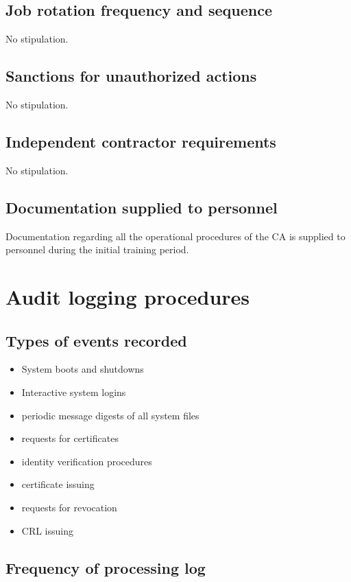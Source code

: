 \documentclass[11pt,a4paper,titlepage]{book}
\begin{document}
\subsection{Job rotation frequency and sequence}

No stipulation.

\subsection{Sanctions for unauthorized actions}

No stipulation.

\subsection{Independent contractor requirements}

No stipulation.

\subsection{Documentation supplied to personnel}

Documentation regarding all the operational procedures of the CA is supplied to personnel during the initial training period.

\section{Audit logging procedures}
\subsection{Types of events recorded}

\begin{itemize}
\item{System boots and shutdowns}
\item{Interactive system logins}
\item{periodic message digests of all system files}
\item{requests for certificates}
\item{identity verification procedures}
\item{certificate issuing}
\item{requests for revocation}
\item{CRL issuing}
\end{itemize}

\subsection{Frequency of processing log}
\end{document}
